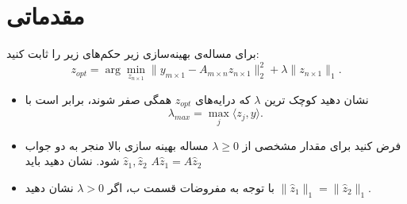 \section{مقدماتی}




برای مساله‌ی بهینه‌سازی زیر حکم‌های زیر را ثابت کنید:
\[
z_{opt}=\arg\min_{z_{n\times1}}\|y_{m\times1}-A_{m\times n}z_{n\times1}\|_{2}^{2}+\lambda\|z_{n\times1}\|_{1}.
\]
\begin{itemize}
\item 
نشان دهید کوچک ترین $\lambda$ که درایه‌های $z_{opt}$‌ همگی صفر شوند، برابر است با
\[
\lambda_{max}=\max_{j}\langle z_{j},y\rangle.
\]

\item
 فرض کنید برای مقدار مشخصی از 
$\lambda\ge0$
مساله بهینه سازی بالا منجر به دو جواب 
$\hat{z}_{1},\hat{z}_{2}$
شود. نشان دهید باید 
$A\hat{z}_{1}=A\hat{z}_{2}$

\item
با توجه به مفروضات قسمت ب، اگر 
$\lambda>0$
نشان دهید 
$\|\hat{z}_{1}\|_{1}=\|\hat{z}_{2}\|_{1}$.
\end{itemize}